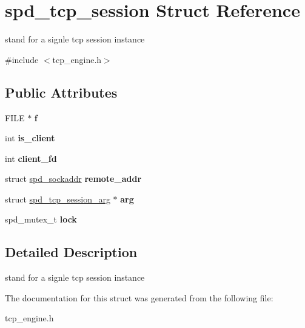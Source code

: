 \hypertarget{structspd__tcp__session}{
\section{spd\_\-tcp\_\-session Struct Reference}
\label{structspd__tcp__session}
}


stand for a signle tcp session instance  




{\ttfamily \#include $<$tcp\_\-engine.h$>$}

\subsection*{Public Attributes}
\begin{DoxyCompactItemize}
\item 
\hypertarget{structspd__tcp__session_a51e64c9da2ebfd52fb7411b9ec98e1b8}{
FILE $\ast$ {\bfseries f}}
\label{structspd__tcp__session_a51e64c9da2ebfd52fb7411b9ec98e1b8}

\item 
\hypertarget{structspd__tcp__session_aabc98ac1961901c6f04792eabd031ece}{
int {\bfseries is\_\-client}}
\label{structspd__tcp__session_aabc98ac1961901c6f04792eabd031ece}

\item 
\hypertarget{structspd__tcp__session_a77961fc6d98ecfa634c673fc89fb937b}{
int {\bfseries client\_\-fd}}
\label{structspd__tcp__session_a77961fc6d98ecfa634c673fc89fb937b}

\item 
\hypertarget{structspd__tcp__session_a6acf49ddbf9b2f3bfeb171195053925d}{
struct \hyperlink{structspd__sockaddr}{spd\_\-sockaddr} {\bfseries remote\_\-addr}}
\label{structspd__tcp__session_a6acf49ddbf9b2f3bfeb171195053925d}

\item 
\hypertarget{structspd__tcp__session_ac3787a39ecbc7a3d75f2078892fa460b}{
struct \hyperlink{structspd__tcp__session__arg}{spd\_\-tcp\_\-session\_\-arg} $\ast$ {\bfseries arg}}
\label{structspd__tcp__session_ac3787a39ecbc7a3d75f2078892fa460b}

\item 
\hypertarget{structspd__tcp__session_a4835ff2134c4690ab806e1fef9cd3e95}{
spd\_\-mutex\_\-t {\bfseries lock}}
\label{structspd__tcp__session_a4835ff2134c4690ab806e1fef9cd3e95}

\end{DoxyCompactItemize}


\subsection{Detailed Description}
stand for a signle tcp session instance 

The documentation for this struct was generated from the following file:\begin{DoxyCompactItemize}
\item 
tcp\_\-engine.h\end{DoxyCompactItemize}
